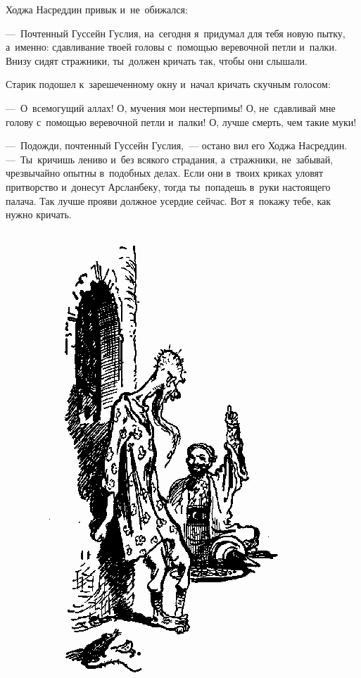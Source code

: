 \documentclass[12pt,a4paper]{book}
\begin{document}
Ходжа Насреддин привык и~не~обижался:

—~Почтенный Гуссейн Гуслия, на~сегодня я~придумал для тебя новую пытку, а~именно: сдавливание твоей головы с~помощью веревочной петли и~палки. Внизу сидят стражники, ты~должен кричать так, чтобы они слышали.

Старик подошел к~зарешеченному окну и~начал кричать скучным голосом:

—~О~всемогущий аллах! О, мучения мои нестерпимы! О, не~сдавливай мне голову с~помощью веревочной петли и~палки! О, лучше смерть, чем такие муки!

—~Подожди, почтенный Гуссейн Гуслия,~— остано вил его Ходжа Насреддин. —~Ты~кричишь лениво и~без всякого страдания, а~стражники, не~забывай, чрезвычайно опытны в~подобных делах. Если они в~твоих криках уловят притворство и~донесут Арсланбеку, тогда ты~попадешь в~руки настоящего палача. Так лучше прояви должное усердие сейчас. Вот я~покажу тебе, как нужно кричать.

\begin{figure}[p]
\centering
\includegraphics[scale=0.85]{14.png}
\end{figure}
\end{document}
